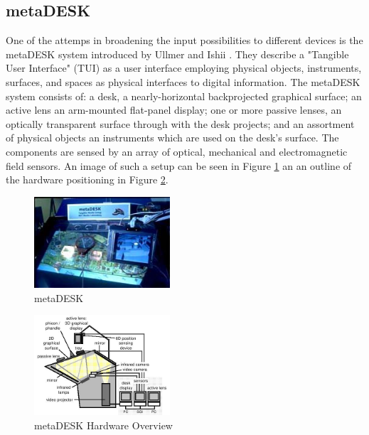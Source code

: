 \subsection{metaDESK}
One of the attemps in broadening the input possibilities to different devices is the metaDESK system introduced by Ullmer and Ishii \cite{ullmer97}. They describe a "Tangible User Interface" (TUI) as a user interface employing physical objects, instruments, surfaces, and spaces as physical interfaces to digital information. The metaDESK system consists of: a desk, a nearly-horizontal backprojected graphical surface; an active lens an arm-mounted flat-panel display; one or more passive lenses, an optically transparent surface through with the desk projects; and an assortment of physical objects an instruments which are used on the desk's surface. The components are sensed by an array of optical, mechanical and electromagnetic field sensors. An image of such a setup can be seen in Figure \ref{fig:metadesk} an an outline of the hardware positioning in Figure \ref{fig:metadeskhardware}.

\begin{figure}
\centering
\includegraphics[width=0.45\textwidth]{figures/metaDesk.jpg}
\caption{metaDESK}
\label{fig:metadesk}
\end{figure}

\begin{figure}
\centering
\includegraphics[width=0.45\textwidth]{figures/metaDeskHardware.jpg}
\caption{metaDESK Hardware Overview}
\label{fig:metadeskhardware}
\end{figure}

